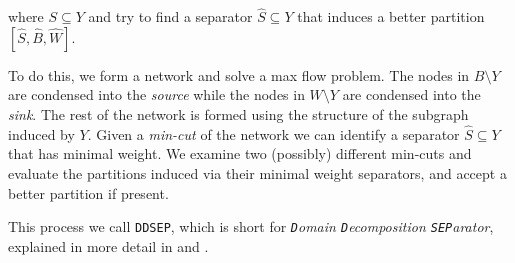 \begin{itemize}
where $S \subseteq Y$ and try to find a separator 
$\widehat S \subseteq Y$ that induces a better partition
$[{\widehat S}, {\widehat B}, {\widehat W}]$.
\par
To do this, we form a network and solve a max flow problem.
The nodes in $B \setminus Y$ are condensed into the {\it source}
while the nodes in $W \setminus Y$ are condensed into the {\it sink}.
The rest of the network is formed using the structure of the
subgraph induced by $Y$.
Given a {\it min-cut} of the network we can identify a separator
${\widehat S} \subseteq Y$ that has minimal weight.
We examine two (possibly) different min-cuts and evaluate the
partitions induced via their minimal weight separators, and accept
a better partition if present.
\end{itemize}
This process we call {\tt DDSEP}, which is short for {\it {\tt D}omain
{\tt D}ecomposition {\tt SEP}arator},
explained in more detail in 
\cite{ash97-DDSEP} and
\cite{ash98-maxflow}.
\par

